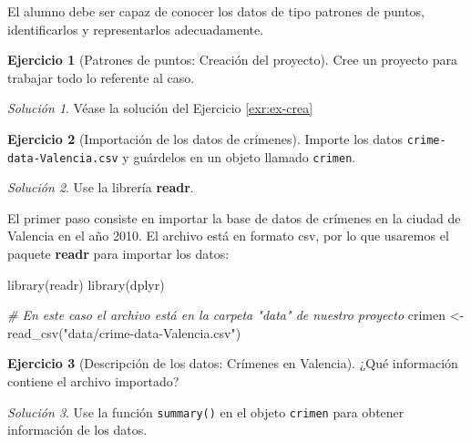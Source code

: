 \documentclass[
]{book}
\newenvironment{Shaded}{\begin{snugshade}}{\end{snugshade}}
\newcommand{\CommentTok}[1]{\textcolor[rgb]{0.56,0.35,0.01}{\textit{#1}}}
\newcommand{\FunctionTok}[1]{\textcolor[rgb]{0.00,0.00,0.00}{#1}}
\newcommand{\NormalTok}[1]{#1}
\newcommand{\OtherTok}[1]{\textcolor[rgb]{0.56,0.35,0.01}{#1}}
\newcommand{\StringTok}[1]{\textcolor[rgb]{0.31,0.60,0.02}{#1}}
\theoremstyle{definition}
\theoremstyle{definition}
\theoremstyle{definition}
\newtheorem{exercise}{Ejercicio}[chapter]
\theoremstyle{definition}
\theoremstyle{remark}
\newtheorem*{solution}{Solución}
\begin{document}
El alumno debe ser capaz de conocer los datos de tipo patrones de puntos,
identificarlos y representarlos adecuadamente.

\begin{exercise}[Patrones de puntos: Creación del proyecto]
\protect\hypertarget{exr:ex24}{}\label{exr:ex24}Cree un proyecto para trabajar todo lo referente al caso.
\end{exercise}

\begin{solution}
Véase la solución del Ejercicio \ref{exr:ex-crea}
\end{solution}

\begin{exercise}[Importación de los datos de crímenes]
\protect\hypertarget{exr:ex25}{}\label{exr:ex25}Importe los datos \texttt{crime-data-Valencia.csv} y guárdelos en un objeto llamado
\texttt{crimen}.
\end{exercise}

\begin{solution}
Use la librería \textbf{readr}.
\end{solution}

El primer paso consiste en importar la base de datos de crímenes en la ciudad de
Valencia en el año 2010. El archivo está en formato csv, por lo que usaremos el
paquete \textbf{readr} \citep{R-readr} para importar los datos:

\begin{Shaded}
\begin{Highlighting}[]
\FunctionTok{library}\NormalTok{(readr)}
\FunctionTok{library}\NormalTok{(dplyr)}

\CommentTok{\# En este caso el archivo está en la carpeta "data" de nuestro proyecto}
\NormalTok{crimen }\OtherTok{\textless{}{-}} \FunctionTok{read\_csv}\NormalTok{(}\StringTok{"data/crime{-}data{-}Valencia.csv"}\NormalTok{)}
\end{Highlighting}
\end{Shaded}

\begin{exercise}[Descripción de los datos: Crímenes en Valencia]
\protect\hypertarget{exr:ex26}{}\label{exr:ex26}¿Qué información contiene el archivo importado?
\end{exercise}

\begin{solution}
Use la función \texttt{summary()} en el objeto \texttt{crimen} para obtener información de los
datos.
\end{solution}
\end{document}
